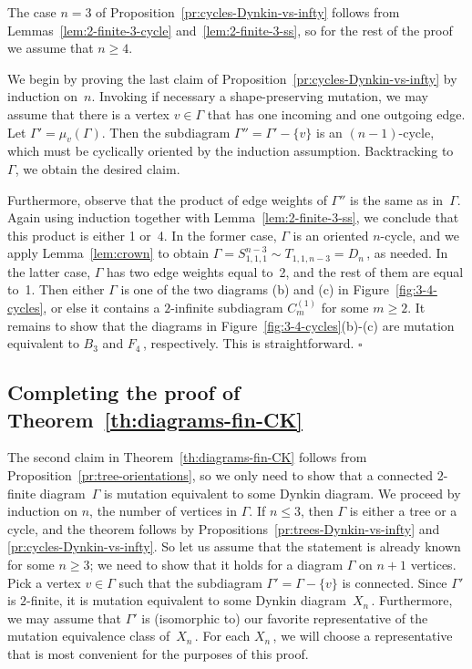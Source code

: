 \documentclass[letterpaper]{amsart}
\numberwithin{equation}{section}
\theoremstyle{definition}
\def\proof{\smallskip\noindent {\bf Proof.\ }}
\def\endproof{\hfill$\square$\medskip}
\begin{document}
\proof 
The case $n=3$ of Proposition~\ref{pr:cycles-Dynkin-vs-infty} follows 
from Lemmas~\ref{lem:2-finite-3-cycle} and~\ref{lem:2-finite-3-ss}, 
so for the rest of the proof we assume that $n\geq 4$. 
 
We begin by proving the last claim of 
Proposition~\ref{pr:cycles-Dynkin-vs-infty} by induction on~$n$. 
Invoking if necessary a shape-preserving mutation, we may assume that there 
is a vertex $v \in \Gamma$ that has one incoming and one outgoing edge. 
Let $\Gamma' = \mu_v (\Gamma)$. 
Then the subdiagram $\Gamma''=\Gamma' - \{v\}$ is an $(n-1)$-cycle, which must be 
cyclically oriented by the induction assumption. Backtracking to~$\Gamma$, we 
obtain the desired claim. 
 
Furthermore, observe that the product of edge weights of $\Gamma''$ is 
the same as in~$\Gamma$. Again using induction together with 
Lemma~\ref{lem:2-finite-3-ss}, we conclude that this product is either 
1 or~4. 
In the former case, $\Gamma$ is an oriented 
$n$-cycle, and we apply Lemma~\ref{lem:crown} to obtain 
$\Gamma = S_{1,1,1}^{n-3}\sim T_{1,1,n-3} = D_n\,$, as needed. 
In the latter case, $\Gamma$ has two edge weights equal to~2, and the 
rest of them are equal to~1. 
Then either $\Gamma$ is one of the two diagrams (b) and (c) in 
Figure~\ref{fig:3-4-cycles}, or else it contains a 
$2$-infinite subdiagram $C_m^{(1)}$ for some $m \geq 2$. 
It remains to show that the diagrams in 
Figure~\ref{fig:3-4-cycles}(b)-(c) are mutation equivalent to $B_3$ 
and $F_4\,$, respectively. This is straightforward. 
\endproof 
 
 
\subsection{Completing the proof of Theorem~\ref{th:diagrams-fin-CK}} 
The second claim in Theorem~\ref{th:diagrams-fin-CK} follows from 
Proposition~\ref{pr:tree-orientations}, so we only need to show 
that a connected $2$-finite diagram~$\Gamma$ is 
mutation equivalent to some Dynkin diagram. 
We proceed by induction on $n$, the number of vertices in 
$\Gamma$. 
If $n \leq 3$, then $\Gamma$ is either a tree or a cycle, and the 
theorem follows by 
Propositions~\ref{pr:trees-Dynkin-vs-infty} and 
\ref{pr:cycles-Dynkin-vs-infty}. 
So let us assume that the statement is already known for some 
$n \geq 3$; we need to show that it holds for a diagram $\Gamma$ on 
$n+1$ vertices. 
Pick a vertex $v\in\Gamma$ such that the subdiagram 
$\Gamma' = \Gamma - \{v\}$ is connected. 
Since $\Gamma'$ is $2$-finite, it is 
mutation equivalent to some Dynkin diagram~$X_n\,$. 
Furthermore, we may assume that $\Gamma'$ is (isomorphic to) 
our favorite representative of the mutation equivalence class 
of~$X_n\,$. For each $X_n\,$, we will choose a representative that is 
most convenient for the purposes of this proof. 
 
\end{document}
